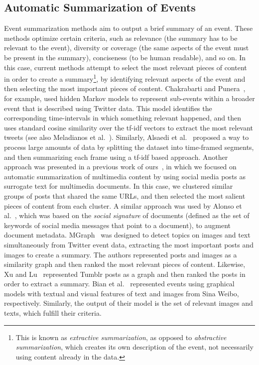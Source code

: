 \subsection{Automatic Summarization of Events} 
%
Event summarization methods aim to output a brief summary of an event.
%
These methods optimize certain criteria, such as relevance (the summary has to
be relevant to the event), diversity or coverage (the same aspects of the event
must be present in the summary), conciseness (to be human readable), and so on.
%
In this case, current methods attempt to select the most relevant pieces of
content in order to create a summary\footnote{This is known as {\em extractive
summarization}, as opposed to {\em abstractive summarization}, which creates its
own description of the event, not necessarily using content already in the
data.}, by identifying relevant aspects of the event and then selecting the most
important pieces of content.
%
Chakrabarti and Punera~\cite{chakrabarti2011event}, for example, used hidden
Markov models to represent sub-events within a broader event that is described
using Twitter data. 
%
This model identifies the corresponding time-intervals in which something
relevant happened, and then uses standard cosine similarity over the tf-idf
vectors to extract the most relevant tweets (see also Meladianos et
al.~\cite{meladianos2018optimization}).
%
Similarly, Alsaedi et al.~\cite{alsaedi2016temporal} proposed a way to process
large amounts of data by splitting the dataset into time-framed segments, and
then summarizing each frame using a tf-idf based approach.
%
Another approach was presented in a previous work of
ours~\cite{quezada2013understanding}, in which we focused on automatic
summarization of multimedia content by using social media posts as surrogate
text for multimedia documents.
%
In this case, we clustered similar groups of posts that shared the same URLs,
and then selected the most salient pieces of content from each cluster.
%
A similar approach was used by Alonso et
al.~\cite{Alonso:2015:WCW:2740908.2745397}, which was based on the \emph{social
signature} of documents (defined as the set of keywords of social media messages
that point to a document), to augment document metadata.
%
MGraph~\cite{schinas2016mgraph} was designed to detect topics on images and text
simultaneously from Twitter event data, extracting the most important posts
and images to create a summary.
%
The authors represented posts and images as a similarity graph and then ranked
the most relevant pieces of content.
%
Likewise, Xu and Lu~\cite{Xu:2015:SBP:2678025.2701385} represented Tumblr posts
as a graph and then ranked the posts in order to extract a summary.
%
Bian et al.~\cite{bian2014multimedia} represented events using graphical models
with textual and visual features of text and images from Sina Weibo,
respectively.
%
Similarly, the output of their model is the set of relevant images and texts,
which fulfill their criteria.

